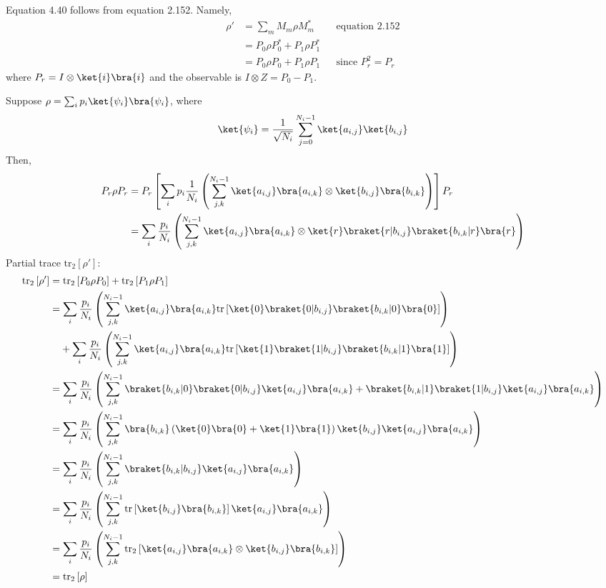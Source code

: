 \begingroup
\newcommand{\tr}[1]{\mathrm{tr} \left[ #1 \right]}
\newcommand{\reduced}[2]{\mathrm{tr}_#1 \left[ #2 \right]}
\newcommand{\ketbra}[2]{\ket{#1} \bra{#2}}
%
\par Equation 4.40 follows from equation 2.152.
%
Namely,
%
\begin{align*}
\rho' &= \sum_m{M_m \rho M_m ^*} && \text{equation 2.152} \\
&= P_0 \rho P_0 ^* + P_1 \rho P_1 ^* \\ &= P_0 \rho P_0 + P_1 \rho P_1 && \text{since $P_r^2 = P_r$}
\end{align*}
%
where $P_r = I \otimes \ket{i} \bra{i}$ and the observable is $I \otimes Z = P_0 - P_1$.
%
\par Suppose $\rho = \sum_i{p_i \ket{\psi_i} \bra{\psi_i}}$, where
%
$$
\ket{\psi_i} = \frac{1}{\sqrt{N_i}} \sum_{j=0}^{N_i - 1}{\ket{a_{i, j}} \ket{b_{i, j}}}
$$
%
Then,
%
\begin{align*}
P_r \rho P_r &= P_r \left[ \sum_i{p_i \frac{1}{N_i} \left( \sum_{j, k}^{N_i - 1}{\ketbra{a_{i, j}}{a_{i, k}} \otimes \ketbra{b_{i, j}}{b_{i, k}}} \right)} \right] P_r \\
&= \sum_i{\frac{p_i}{N_i} \left( \sum_{j, k}^{N_i - 1}{\ketbra{a_{i, j}}{a_{i, k}} \otimes \ket{r} \braket{r|b_{i, j}} \braket{b_{i, k}|r} \bra{r}} \right)}
\end{align*}
%
Partial trace $\reduced{2}{\rho'}$:
%
\begin{align*}
\reduced{2}{\rho'} &= \reduced{2}{P_0 \rho P_0} + \reduced{2}{P_1 \rho P_1} \\
&= \sum_i{\frac{p_i}{N_i} \left( \sum_{j, k}^{N_i - 1}{\ketbra{a_{i, j}}{a_{i, k}} \tr{\ket{0} \braket{0|b_{i, j}} \braket{b_{i, k}|0} \bra{0}}} \right)} \\
&\phantom{={}} + \sum_i{\frac{p_i}{N_i} \left( \sum_{j, k}^{N_i - 1}{\ketbra{a_{i, j}}{a_{i, k}} \tr{\ket{1} \braket{1|b_{i, j}} \braket{b_{i, k}|1} \bra{1}}} \right)} \\
&= \sum_i{\frac{p_i}{N_i} \left( \sum_{j, k}^{N_i - 1}{\braket{b_{i, k}|0} \braket{0|b_{i, j}} \ketbra{a_{i, j}}{a_{i, k}} + \braket{b_{i, k}|1} \braket{1|b_{i, j}} \ketbra{a_{i, j}}{a_{i, k}}} \right)} \\
&= \sum_i{\frac{p_i}{N_i} \left( \sum_{j, k}^{N_i - 1}{\bra{b_{i, k}} \left( \ketbra{0}{0} + \ketbra{1}{1} \right) \ket{b_{i, j}} \ketbra{a_{i, j}}{a_{i, k}}} \right)} \\
&= \sum_i{\frac{p_i}{N_i} \left( \sum_{j, k}^{N_i - 1}{\braket{b_{i, k}|b_{i, j}} \ketbra{a_{i, j}}{a_{i, k}}} \right)} \\
&= \sum_i{\frac{p_i}{N_i} \left( \sum_{j, k}^{N_i - 1}{\tr{\ketbra{b_{i, j}}{b_{i, k}}} \ketbra{a_{i, j}}{a_{i, k}}} \right)} \\
&= \sum_i{\frac{p_i}{N_i} \left( \sum_{j, k}^{N_i - 1}{\reduced{2}{\ketbra{a_{i, j}}{a_{i, k}} \otimes \ketbra{b_{i, j}}{b_{i, k}}}} \right)} \\
&= \reduced{2}{\rho}
\end{align*}
\endgroup
